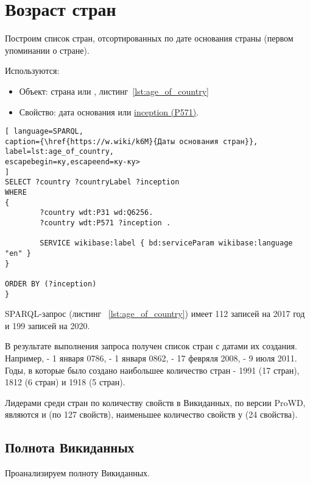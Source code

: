 \section{Возраст стран}

Построим список стран, отсортированных по дате основания страны (первом упоминании о стране).

Используются:

\begin{itemize}
	\item Объект: страна или , листинг~\ref{lst:age_of_country}
	\item Свойство: дата основания или \href{https://www.wikidata.org/wiki/Property:P571}{inception (P571)}.
\end{itemize}

\begin{lstlisting}[ language=SPARQL, 
caption={\href{https://w.wiki/k6M}{Даты основания стран}},
label=lst:age_of_country, 
escapebegin=ку,escapeend=ку-ку>
]
SELECT ?country ?countryLabel ?inception
WHERE
{
		?country wdt:P31 wd:Q6256.
		?country wdt:P571 ?inception .
		
		SERVICE wikibase:label { bd:serviceParam wikibase:language "en" }
}

ORDER BY (?inception)
}
\end{lstlisting}

SPARQL-запрос (листинг ~\ref{lst:age_of_country}) имеет 112 записей на 2017 год и 199 записей на 2020.

В результате выполнения запроса получен список стран с датами их создания. Например,  - 1 января 0786,  - 1 января 0862,  - 17 февряля 2008,  - 9 июля 2011. Годы, в которые было создано наибольшее количество стран - 1991 (17 стран), 1812 (6 стран) и 1918 (5 стран).

Лидерами среди стран по количеству свойств в Викиданных, по версии ProWD, являются  и  (по 127 свойств), наименьшее количество свойств у  (24 свойства).

\subsection{Полнота Викиданных}

Проанализируем полноту Викиданных.

